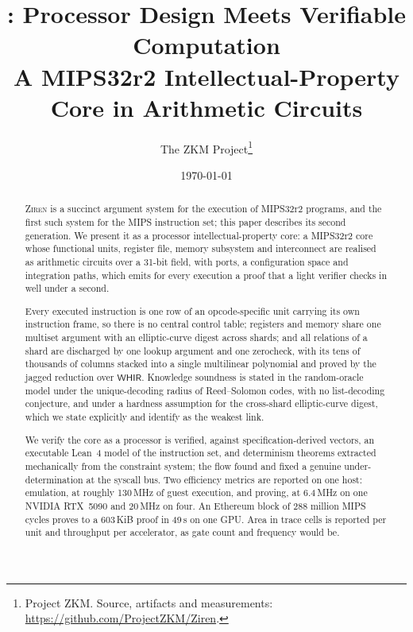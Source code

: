 \documentclass[10pt,letterpaper]{article}
\title{\Zirenver{}: Processor Design Meets Verifiable Computation\\[0.4em]\large A MIPS32r2 Intellectual-Property Core in Arithmetic Circuits}
\author{The ZKM Project\thanks{Project ZKM. Source, artifacts and measurements: \url{https://github.com/ProjectZKM/Ziren}.}}
\date{\today}
\theoremstyle{definition}
\theoremstyle{remark}
\theoremstyle{plain}
\newcommand{\WHIR}{\ensuremath{\mathsf{WHIR}}}
\newcommand{\Ziren}{\textsc{Ziren}}
\begin{document}
\maketitle

\begin{abstract}
\Ziren{} is a succinct argument system for the execution of MIPS32r2 programs, and the first such system for the MIPS instruction set; this paper describes its second generation. We present it as a processor intellectual-property core: a MIPS32r2 core whose functional units, register file, memory subsystem and interconnect are realised as arithmetic circuits over a 31-bit field, with ports, a configuration space and integration paths, which emits for every execution a proof that a light verifier checks in well under a second.

Every executed instruction is one row of an opcode-specific unit carrying its own instruction frame, so there is no central control table; registers and memory share one multiset argument with an elliptic-curve digest across shards; and all relations of a shard are discharged by one lookup argument and one zerocheck, with its tens of thousands of columns stacked into a single multilinear polynomial and proved by the jagged reduction over \WHIR{}. Knowledge soundness is stated in the random-oracle model under the unique-decoding radius of Reed--Solomon codes, with no list-decoding conjecture, and under a hardness assumption for the cross-shard elliptic-curve digest, which we state explicitly and identify as the weakest link.

We verify the core as a processor is verified, against specification-derived vectors, an executable Lean~4 model of the instruction set, and determinism theorems extracted mechanically from the constraint system; the flow found and fixed a genuine under-determination at the syscall bus. Two efficiency metrics are reported on one host: emulation, at roughly 130\,MHz of guest execution, and proving, at 6.4\,MHz on one NVIDIA RTX~5090 and 20\,MHz on four. An Ethereum block of 288 million MIPS cycles proves to a 603\,KiB proof in 49\,s on one GPU. Area in trace cells is reported per unit and throughput per accelerator, as gate count and frequency would be.
\end{abstract}











\appendix





\end{document}
